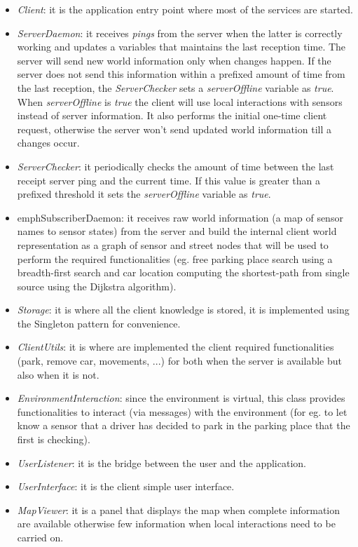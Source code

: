\documentclass[11pt]{article}
\begin{document}
\begin{itemize}
\item \emph{Client}: it is the application entry point where most of the services are started.
\item \emph{ServerDaemon}: it receives \emph{pings} from the server when the latter is correctly working and updates a variables that maintains the last reception time. The server will send new world information only when changes happen. If the server does not send this information within a prefixed amount of time from the last reception, the \emph{ServerChecker} sets a \emph{serverOffline} variable as \emph{true}. When \emph{serverOffline} is \emph{true} the client will use local interactions with sensors instead of server information. It also performs the initial one-time client request, otherwise the server won't send updated world information till a changes occur.
\item \emph{ServerChecker}: it periodically checks the amount of time between the last receipt server ping and the current time. If this value is greater than a prefixed threshold it sets the \emph{serverOffline} variable as \emph{true}.
\item emph{SubscriberDaemon}: it receives raw world information (a map of sensor names to sensor states) from the server and build the internal client world representation as a graph of sensor and street nodes that will be used to perform the required functionalities (eg. free parking place search using a breadth-first search and car location computing the shortest-path from single source using the Dijkstra algorithm).
\item \emph{Storage}: it is where all the client knowledge is stored, it is implemented using the Singleton pattern for convenience.
\item \emph{ClientUtils}: it is where are implemented the client required functionalities (park, remove car, movements, ...) for both when the server is available but also when it is not.
\item \emph{EnvironmentInteraction}: since the environment is virtual, this class provides functionalities to interact (via messages) with the environment (for eg. to let know a sensor that a driver has decided to park in the parking place that the first is checking).
\item \emph{UserListener}: it is the bridge between the user and the application.
\item \emph{UserInterface}: it is the client simple user interface.
\item \emph{MapViewer}: it is a panel that displays the map when complete information are available otherwise few information when local interactions need to be carried on.

\end{itemize}
\end{document}
